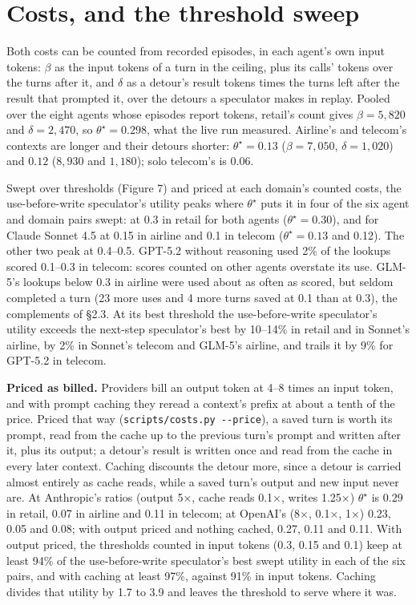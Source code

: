 \documentclass[10pt,twocolumn,letterpaper]{article}
\newcommand{\runin}[1]{{\sffamily\bfseries\color{accent}#1}}
\begin{document}
\section{Costs, and the threshold sweep}\label{costs-and-the-threshold-sweep}

Both costs can be counted from recorded episodes, in each agent's own input tokens: \(\beta\) as the input tokens of a turn in the ceiling, plus its calls' tokens over the turns after it, and \(\delta\) as a detour's result tokens times the turns left after the result that prompted it, over the detours a speculator makes in replay. Pooled over the eight agents whose episodes report tokens, retail's count gives \(\beta = 5{,}820\) and \(\delta = 2{,}470\), so \(\theta^\star = 0.298\), what the live run measured. Airline's and telecom's contexts are longer and their detours shorter: \(\theta^\star = 0.13\) (\(\beta = 7{,}050\), \(\delta = 1{,}020\)) and \(0.12\) (\(8{,}930\) and \(1{,}180\)); solo telecom's is \(0.06\).

Swept over thresholds (Figure 7) and priced at each domain's counted costs, the use-before-write speculator's utility peaks where \(\theta^\star\) puts it in four of the six agent and domain pairs swept: at 0.3 in retail for both agents (\(\theta^\star = 0.30\)), and for Claude Sonnet 4.5 at 0.15 in airline and 0.1 in telecom (\(\theta^\star = 0.13\) and 0.12). The other two peak at 0.4--0.5. GPT-5.2 without reasoning used 2\% of the lookups scored 0.1--0.3 in telecom: scores counted on other agents overstate its use. GLM-5's lookups below 0.3 in airline were used about as often as scored, but seldom completed a turn (23 more uses and 4 more turns saved at 0.1 than at 0.3), the complements of §2.3. At its best threshold the use-before-write speculator's utility exceeds the next-step speculator's best by 10--14\% in retail and in Sonnet's airline, by 2\% in Sonnet's telecom and GLM-5's airline, and trails it by 9\% for GPT-5.2 in telecom.

\runin{Priced as billed.} Providers bill an output token at 4--8 times an input token, and with prompt caching they reread a context's prefix at about a tenth of the price. Priced that way (\texttt{scripts/costs.py\ -\/-price}), a saved turn is worth its prompt, read from the cache up to the previous turn's prompt and written after it, plus its output; a detour's result is written once and read from the cache in every later context. Caching discounts the detour more, since a detour is carried almost entirely as cache reads, while a saved turn's output and new input never are. At Anthropic's ratios (output 5×, cache reads 0.1×, writes 1.25×) \(\theta^\star\) is 0.29 in retail, 0.07 in airline and 0.11 in telecom; at OpenAI's (8×, 0.1×, 1×) 0.23, 0.05 and 0.08; with output priced and nothing cached, 0.27, 0.11 and 0.11. With output priced, the thresholds counted in input tokens (0.3, 0.15 and 0.1) keep at least 94\% of the use-before-write speculator's best swept utility in each of the six pairs, and with caching at least 97\%, against 91\% in input tokens. Caching divides that utility by 1.7 to 3.9 and leaves the threshold to serve where it was.
\end{document}
